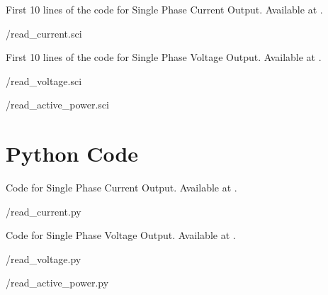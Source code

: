\begin{scicode}
{First 10 lines of the code for Single Phase Current Output.
  Available at .}
\label{sci:current-modbus}

{\LocMODscicode/read_current.sci}
\end{scicode}

\begin{scicode}
{First 10 lines of the code for Single Phase Voltage Output.
  Available at .}
\label{sci:voltage-modbus}

{\LocMODscicode/read_voltage.sci}
\end{scicode}

\begin{scicode}
\label{sci:modbus-power}

{\LocMODscicode/read_active_power.sci}
\end{scicode}

\section{Python Code}
\label{sec:modbus-python-code}

\begin{pycode}
{Code for Single Phase Current Output.
  Available at .}
\label{py:current-modbus}

{\LocMODpycode/read_current.py}
\end{pycode}

\begin{pycode}
{Code for Single Phase Voltage Output.
  Available at .}
\label{py:voltage-modbus}

{\LocMODpycode/read_voltage.py}
\end{pycode}

\begin{pycode}
\label{py:modbus-power}

{\LocMODpycode/read_active_power.py}
\end{pycode}

